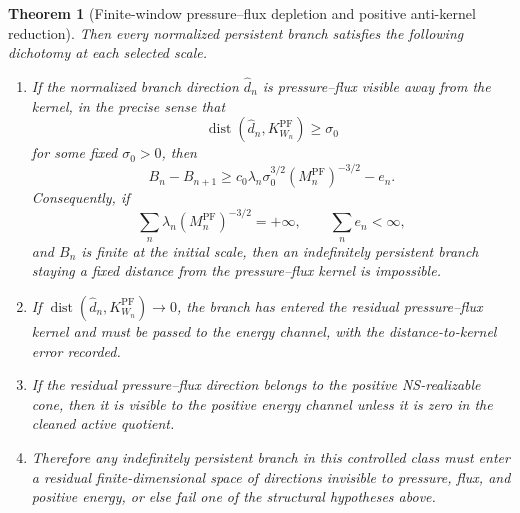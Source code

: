 \documentclass[11pt]{article}
\numberwithin{equation}{section}
\theoremstyle{plain}
\newtheorem{theorem}{Theorem}[section]
\theoremstyle{definition}
\theoremstyle{remark}
\newcommand{\PF}{\mathrm{PF}}
\newcommand{\dist}{\operatorname{dist}}
\begin{document}
\begin{theorem}[Finite-window pressure--flux depletion and positive anti-kernel reduction]
Then every normalized persistent branch satisfies the following dichotomy at each selected scale.

\begin{enumerate}[label=\textup{(\alph*)},leftmargin=2.2em]
    \item If the normalized branch direction \(\widehat d_n\) is pressure--flux visible away from the kernel, in the precise sense that
    \[
        \dist(\widehat d_n,K^{\PF}_{W_n})\ge \sigma_0
    \]
    for some fixed \(\sigma_0>0\), then
    \begin{equation}
        B_n-B_{n+1}
        \ge
        c_0\lambda_n\sigma_0^{3/2}(M_n^{\PF})^{-3/2}-e_n.
        \label{eq:main-pf-depletion}
    \end{equation}
    Consequently, if
    \begin{equation}
        \sum_{n}\lambda_n(M_n^{\PF})^{-3/2}=+\infty,
        \qquad
        \sum_n e_n<\infty,
        \label{eq:main-divergence-condition}
    \end{equation}
    and \(B_n\) is finite at the initial scale, then an indefinitely persistent branch staying a fixed distance from the pressure--flux kernel is impossible.
    \item If \(\dist(\widehat d_n,K^{\PF}_{W_n})\to0\), the branch has entered the residual pressure--flux kernel and must be passed to the energy channel, with the distance-to-kernel error recorded.
    \item If the residual pressure--flux direction belongs to the positive NS-realizable cone, then it is visible to the positive energy channel unless it is zero in the cleaned active quotient.
    \item Therefore any indefinitely persistent branch in this controlled class must enter a residual finite-dimensional space of directions invisible to pressure, flux, and positive energy, or else fail one of the structural hypotheses above.
\end{enumerate}
\end{theorem}
\end{document}
